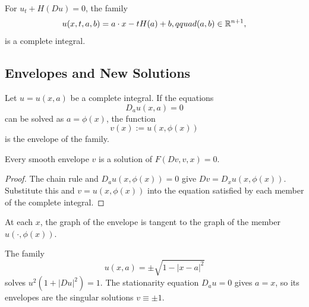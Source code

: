 \begin{example}
\label{ex:hamilton-jacobi-complete-integral}

For $u_t+H(Du)=0$, the family
\[
u(x,t,a,b)=a\cdot x-tH(a)+b,qquad (a,b)\in\mathbb{R}^{n+1},
\]
is a complete integral.
\end{example}

\subsection{Envelopes and New Solutions}
\label{sec:envelopes-new-solutions}

\begin{definition}[Envelope]
\label{def:envelope}
Let $u=u(x,a)$ be a complete integral. If the equations
\[
D_a u(x,a)=0
\]
can be solved as $a=\phi(x)$, the function
\[
v(x):=u(x,\phi(x))
\]
is the envelope of the family.
\end{definition}

\begin{theorem}
\label{thm:envelope-solves-pde}

Every smooth envelope $v$ is a solution of $F(Dv,v,x)=0$.
\end{theorem}

\begin{proof}
\sketch The chain rule and $D_a u(x,\phi(x))=0$ give
$Dv=D_xu(x,\phi(x))$. Substitute this and $v=u(x,\phi(x))$ into the
equation satisfied by each member of the complete integral.
\end{proof}

\begin{remark}
\label{rem:envelope-tangency}

At each $x$, the graph of the envelope is tangent to the graph of the member
$u(\cdot,\phi(x))$.
\end{remark}

\begin{example}[Envelope of a complete integral for $u^2(1+|Du|^2)=1$]
\label{ex:envelope-singular-integral}

The family
\[
u(x,a)=\pm\sqrt{1-|x-a|^2}
\]
solves $u^2(1+|Du|^2)=1$. The stationarity equation $D_a u=0$ gives
$a=x$, so its envelopes are the singular solutions $v\equiv\pm1$.
\end{example}

